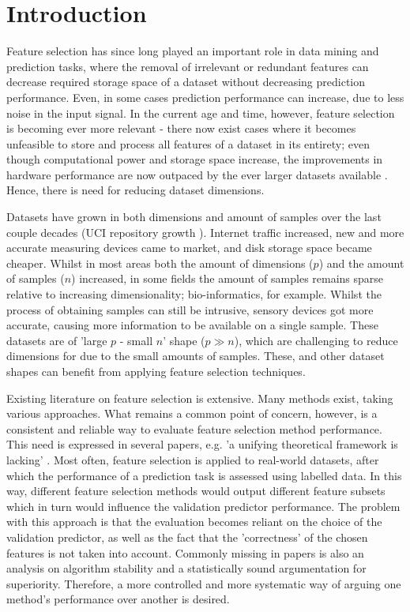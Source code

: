 \documentclass{article}
\begin{document}
\section{Introduction}
Feature selection has since long played an important role in data mining and prediction tasks, where the removal of irrelevant or redundant features can decrease required storage space of a dataset without decreasing prediction performance. Even, in some cases prediction performance can increase, due to less noise in the input signal. In the current age and time, however, feature selection is becoming ever more relevant - there now exist cases where it becomes unfeasible to store and process all features of a dataset in its entirety; even though computational power and storage space increase, the improvements in hardware performance are now outpaced by the ever larger datasets available \citep{thomee2016yfcc100m}. Hence, there is need for reducing dataset dimensions.

Datasets have grown in both dimensions and amount of samples over the last couple decades (UCI repository growth \citep{alelyani2013feature}). Internet traffic increased, new and more accurate measuring devices came to market, and disk storage space became cheaper. Whilst in most areas both the amount of dimensions ($p$) and the amount of samples ($n$) increased, in some fields the amount of samples remains sparse relative to increasing dimensionality; bio-informatics, for example. Whilst the process of obtaining samples can still be intrusive, sensory devices got more accurate, causing more information to be available on a single sample. These datasets are of 'large $p$ - small $n$' shape ($p \gg n$), which are challenging to reduce dimensions for due to the small amounts of samples. These, and other dataset shapes can benefit from applying feature selection techniques. 

Existing literature on feature selection is extensive. Many methods exist, taking various approaches. What remains a common point of concern, however, is a consistent and reliable way to evaluate feature selection method performance. This need is expressed in several papers, e.g. 'a unifying theoretical framework is lacking' \citep{guyon2003introduction}. Most often, feature selection is applied to real-world datasets, after which the performance of a prediction task is assessed using labelled data. In this way, different feature selection methods would output different feature subsets which in turn would influence the validation predictor performance. The problem with this approach is that the evaluation becomes reliant on the choice of the validation predictor, as well as the fact that the 'correctness' of the chosen features is not taken into account. Commonly missing in papers is also an analysis on algorithm stability and a statistically sound argumentation for superiority. Therefore, a more controlled and more systematic way of arguing one method's performance over another is desired.
\end{document}
